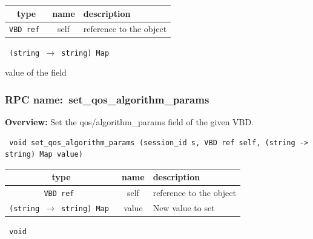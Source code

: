 
 
\vspace{0.3cm}
\begin{tabular}{|c|c|p{7cm}|}
 \hline
{\bf type} & {\bf name} & {\bf description} \\ \hline
{\tt VBD ref } & self & reference to the object \\ \hline 

\end{tabular}

\vspace{0.3cm}

{\tt 
(string $\rightarrow$ string) Map
}


value of the field
\vspace{0.3cm}
\vspace{0.3cm}
\vspace{0.3cm}
\subsubsection{RPC name:~set\_qos\_algorithm\_params}

{\bf Overview:} 
Set the qos/algorithm\_params field of the given VBD.

\begin{verbatim} void set_qos_algorithm_params (session_id s, VBD ref self, (string -> string) Map value)\end{verbatim}



 
\vspace{0.3cm}
\begin{tabular}{|c|c|p{7cm}|}
 \hline
{\bf type} & {\bf name} & {\bf description} \\ \hline
{\tt VBD ref } & self & reference to the object \\ \hline 

{\tt (string $\rightarrow$ string) Map } & value & New value to set \\ \hline 

\end{tabular}

\vspace{0.3cm}

{\tt 
void
}



\vspace{0.3cm}
\vspace{0.3cm}
\vspace{0.3cm}
